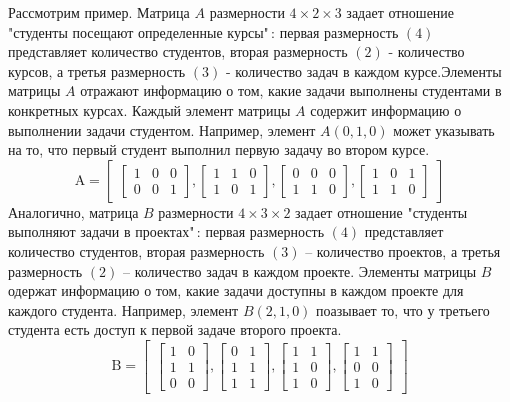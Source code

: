 \documentclass{article}
\begin{document}
Рассмотрим пример. Матрица $A$ размерности $4 \times 2 \times 3$ задает отношение "студенты посещают определенные курсы"\,: первая размерность $(4)$ представляет количество студентов, вторая размерность $(2)$ - количество курсов, а третья размерность $(3)$ - количество задач в каждом курсе.Элементы матрицы $A$ отражают информацию о том, какие задачи выполнены студентами в конкретных курсах. Каждый элемент матрицы $A$ содержит информацию о выполнении задачи студентом. Например, элемент $A(0, 1, 0)$ может указывать на то, что первый студент выполнил первую задачу во втором курсе.
\[
\text{A} = \begin{bmatrix}
    \begin{bmatrix}
      1 & 0 & 0 \\
      0 & 0 & 1 
      \end{bmatrix},
     
    \begin{bmatrix}
      1 & 1 & 0 \\
      1 & 0 & 1 
    \end{bmatrix},
    \begin{bmatrix}
      0 & 0 & 0 \\
      1 & 1 & 0 
    \end{bmatrix},
     
    \begin{bmatrix}
      1 & 0 & 1 \\
      1 & 1 & 0 
    \end{bmatrix}
\end{bmatrix}
\] 
Аналогично, матрица $B$ размерности $4 \times 3 \times 2$ задает отношение "студенты выполняют задачи в проектах"\,:  первая размерность $(4)$ представляет количество студентов, вторая размерность $(3)$ -- количество проектов, а третья размерность $(2)$ -- количество задач в каждом проекте. Элементы матрицы $B$ одержат информацию о том, какие задачи доступны в каждом проекте для каждого студента. Например, элемент $B(2, 1, 0)$ поазывает то, что у третьего студента есть доступ к первой задаче второго проекта.
\[
\text{B} = \begin{bmatrix}
    \begin{bmatrix}
      1 & 0 \\
      1 & 1 \\
      0 & 0 
    \end{bmatrix} , 

    \begin{bmatrix}  
      0 & 1 \\
      1 & 1 \\
      1 & 1
    \end{bmatrix},
    \begin{bmatrix} 
      1 & 1 \\
      1 & 0 \\
      1 & 0
    \end{bmatrix},
    
    \begin{bmatrix} 
      1 & 1 \\
      0 & 0 \\
      1 & 0 
    \end{bmatrix} 
\end{bmatrix}
\] 
\end{document}
